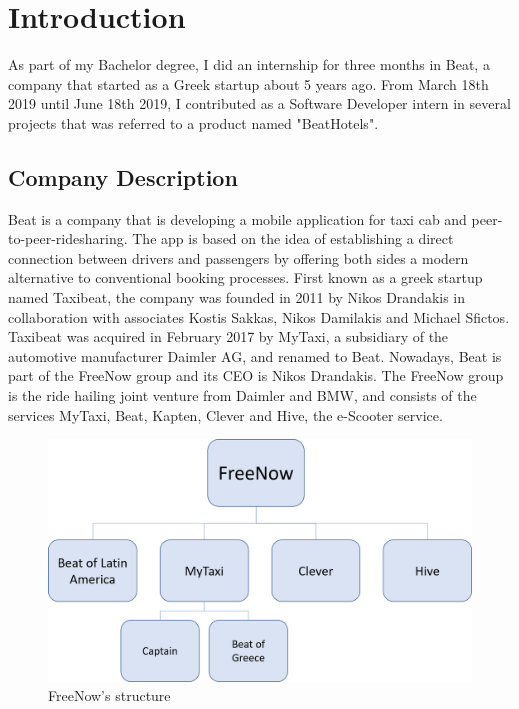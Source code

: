 
\chapter{Introduction} %
\label{Chapter1}
As part of my Bachelor degree, I did an internship for three months in Beat, a company that started as a Greek startup about 5 years ago. From March 18th 2019 until June 18th 2019, I contributed as a Software Developer intern in several projects that was referred to a product named "BeatHotels".

\section{Company Description}
Beat is a company that is developing a mobile application for taxi cab and peer-to-peer-ridesharing. The app is based on the idea of establishing a direct connection between drivers and passengers by offering both sides a modern alternative to conventional booking processes. First known as a greek startup named Taxibeat, the company was founded in 2011 by Nikos Drandakis in collaboration with associates Kostis Sakkas, Nikos Damilakis and Michael Sfictos. Taxibeat was acquired in February 2017 by MyTaxi, a subsidiary of the automotive manufacturer Daimler AG, and renamed to Beat. Nowadays, Beat is part of the FreeNow group and its CEO is Nikos Drandakis. The FreeNow group is the ride hailing joint venture from Daimler and BMW, and consists of the services MyTaxi, Beat, Kapten, Clever and Hive, the e-Scooter service. \par %

\begin{figure}[h!]
	\begin{center}
		\includegraphics[scale=0.5]{images/FreeNow_structure.png}
	\end{center}
	\caption{FreeNow's structure}
\end{figure}
\newpage

